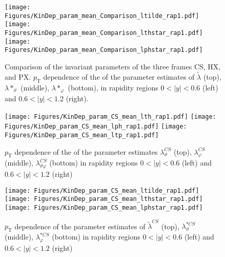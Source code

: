 \documentclass[12pt]{article}
\newcommand{\pT}{p_\mathrm{T}}
\newcommand{\absy}{\left |  y \right |}
\newcommand{\lamtilde}{\tilde{\lambda}}
\newcommand{\lamthstar}{\lambda*_\vartheta}
\newcommand{\lamphstar}{\lambda*_\varphi}
\newcommand{\lamthCS}{\lambda^{\scriptscriptstyle CS}_\vartheta}
\newcommand{\lamphCS}{\lambda^{\scriptscriptstyle CS}_\varphi}
\newcommand{\lamthphCS}{\lambda^{\scriptscriptstyle CS}_{\vartheta \varphi}}
\newcommand{\lamtildeCS}{\tilde{\lambda}^{\scriptscriptstyle CS}}
\newcommand{\lamthstarCS}{\lambda^{* \scriptscriptstyle CS}_\vartheta}
\newcommand{\lamphstarCS}{\lambda^{* \scriptscriptstyle CS}_\varphi}
\begin{document}




\begin{figure}[htbp]
\centering
\texttt{[image: Figures/KinDep\_param\_mean\_Comparison\_ltilde\_rap1.pdf]}
\texttt{[image: Figures/KinDep\_param\_mean\_Comparison\_lthstar\_rap1.pdf]}
\texttt{[image: Figures/KinDep\_param\_mean\_Comparison\_lphstar\_rap1.pdf]}
\caption{Comparison of the invariant parameters of the three frames CS, HX,
and PX. $\pT$ dependence of the of the
parameter estimates of $\lamtilde$ (top), $\lamthstar$ (middle), $\lamphstar$ (bottom), in rapidity regions $0<\absy<0.6$ (left) and
$0.6<\absy<1.2$ (right).}
\end{figure}
\clearpage





\begin{figure}[htbp]
\centering
\texttt{[image: Figures/KinDep\_param\_CS\_mean\_lth\_rap1.pdf]}
\texttt{[image: Figures/KinDep\_param\_CS\_mean\_lph\_rap1.pdf]}
\texttt{[image: Figures/KinDep\_param\_CS\_mean\_ltp\_rap1.pdf]}
\caption{$\pT$ dependence of the of the parameter estimates $\lamthCS$ (top), $\lamphCS$ (middle), $\lamthphCS$ (bottom) in rapidity regions $0<\absy<0.6$ (left) and $0.6<\absy<1.2$ (right)}
\end{figure}
\clearpage

\begin{figure}[htbp]
\centering
\texttt{[image: Figures/KinDep\_param\_CS\_mean\_ltilde\_rap1.pdf]}
\texttt{[image: Figures/KinDep\_param\_CS\_mean\_lthstar\_rap1.pdf]}
\texttt{[image: Figures/KinDep\_param\_CS\_mean\_lphstar\_rap1.pdf]}
\caption{$\pT$ dependence of the parameter estimates of $\lamtildeCS$ (top),
$\lamthstarCS$ (middle), $\lamphstarCS$ (bottom) in rapidity regions $0<\absy<0.6$ (left) and $0.6<\absy<1.2$ (right)}
\end{figure}
\clearpage
\end{document}
